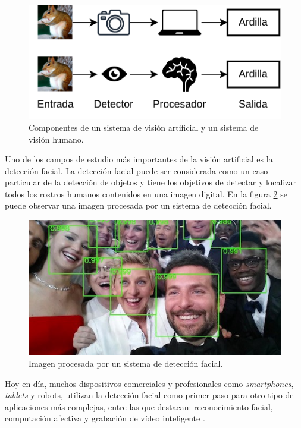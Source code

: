 \begin{figure}[h]
	\centering
	\includegraphics[scale=0.3]{./Figures/mv_comp.png}
	\caption{Componentes de un sistema de visión artificial y un sistema de visión humano.}
	\label{fig:mv_comp}
\end{figure}

Uno de los campos de estudio más importantes de la visión artificial es la detección facial. La detección facial puede ser considerada como un caso particular de la detección de objetos y tiene los objetivos de detectar y localizar todos los rostros humanos contenidos en una imagen digital. En la figura \ref{fig:mv_fd} se puede observar una imagen procesada por un sistema de detección facial.

\begin{figure}[h]
	\centering
	\includegraphics[scale=0.5]{./Figures/mv_fd.jpeg}
	\caption{Imagen procesada por un sistema de detección facial\protect\footnotemark.}
	\label{fig:mv_fd}
\end{figure}

Hoy en día, muchos dispositivos comerciales y profesionales como \textit{smartphones}, \textit{tablets} y robots, utilizan la detección facial como primer paso para otro tipo de aplicaciones más complejas, entre las que destacan: reconocimiento facial, computación afectiva y grabación de vídeo inteligente \cite{fd_apps}.

